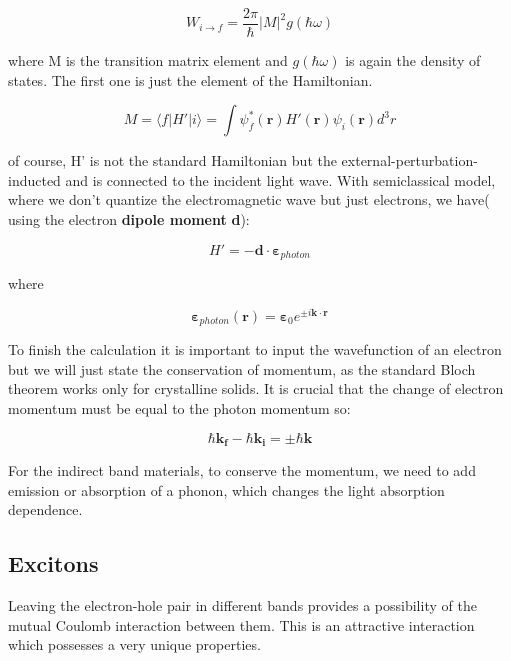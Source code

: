 \begin{equation}
W_{i\rightarrow f} = \frac{2\pi}{\hbar}|M|^2g(\hbar \omega)
\end{equation}

where M is the transition matrix element and $g(\hbar \omega)$ is again the density of states. The first one is just the element of the Hamiltonian. 

\begin{equation}
M = \langle f|H'| i \rangle = \int \psi_f^* (\mathbf{r})H'(\mathbf{r})\psi_i(\mathbf{r}) d^3r
\end{equation}

of course, H' is not the standard Hamiltonian but the external-perturbation-inducted  and is connected to the incident light wave. With semiclassical model, where we don't quantize the electromagnetic wave but just electrons, we have( using the electron \textbf{dipole moment} \textbf{d}):

\begin{equation}
H' =- \mathbf{d} \cdot \mathbf{\varepsilon} _{photon}
\end{equation}

where

\begin{equation}
\mathbf{\varepsilon} _{photon} (\mathbf{r}) = \mathbf{\varepsilon} _0 e^{\pm i \mathbf{k \cdot r}}
\end{equation}

To finish the calculation it is important to input the wavefunction of an electron but we will just state  the conservation of momentum, as the standard Bloch theorem works only for crystalline solids. It is crucial that the change of electron momentum must be equal to the photon momentum so:

\begin{equation}
\hbar \mathbf{k_f} - \hbar \mathbf{k_i} = \pm \hbar \mathbf{k}
\end{equation}

For the indirect band materials, to conserve the momentum, we need to add emission or absorption of a phonon,  which changes the light absorption dependence. 

\subsection{Excitons}
Leaving the electron-hole pair in different bands provides a possibility of the mutual Coulomb interaction between them. This is an attractive interaction which possesses a very unique properties. 

